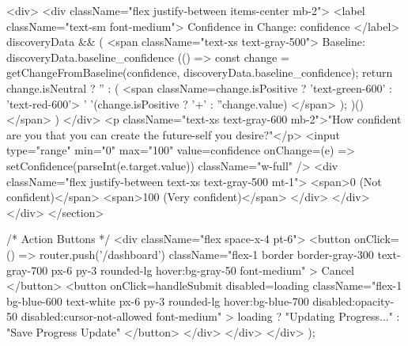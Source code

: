 {            <div>
              <div className="flex justify-between items-center mb-2">
                <label className="text-sm font-medium">
                  Confidence in Change: {confidence}
                </label>
                {discoveryData && (
                  <span className="text-xs text-gray-500">
                    Baseline: {discoveryData.baseline_confidence}
                    {(() => {
                      const change = getChangeFromBaseline(confidence, discoveryData.baseline_confidence);
                      return change.isNeutral ? '' : (
                        <span className={change.isPositive ? 'text-green-600' : 'text-red-600'}>
                          {' '}({change.isPositive ? '+' : ''}{change.value})
                        </span>
                      );
                    })()}
                  </span>
                )}
              </div>
              <p className="text-xs text-gray-600 mb-2">"How confident are you that you can create the future-self you desire?"</p>
              <input
                type="range"
                min="0"
                max="100"
                value={confidence}
                onChange={(e) => setConfidence(parseInt(e.target.value))}
                className="w-full"
              />
              <div className="flex justify-between text-xs text-gray-500 mt-1">
                <span>0 (Not confident)</span>
                <span>100 (Very confident)</span>
              </div>
            </div>
          </div>
        </section>

        {/* Action Buttons */}
        <div className="flex space-x-4 pt-6">
          <button
            onClick={() => router.push('/dashboard')}
            className="flex-1 border border-gray-300 text-gray-700 px-6 py-3 rounded-lg hover:bg-gray-50 font-medium"
          >
            Cancel
          </button>
          <button
            onClick={handleSubmit}
            disabled={loading}
            className="flex-1 bg-blue-600 text-white px-6 py-3 rounded-lg hover:bg-blue-700 disabled:opacity-50 disabled:cursor-not-allowed font-medium"
          >
            {loading ? "Updating Progress..." : "Save Progress Update"}
          </button>
        </div>
      </div>
    </div>
  );
}
